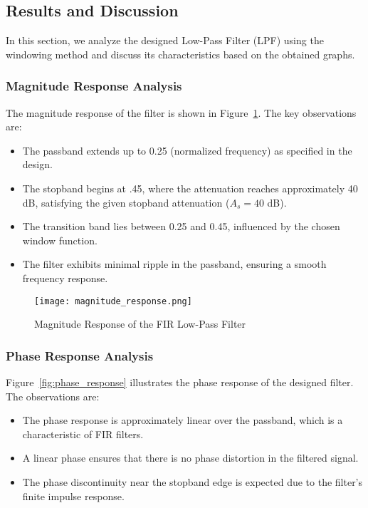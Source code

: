 \documentclass[a4paper,12pt]{article}
\begin{document}
\subsection{Results and Discussion}

In this section, we analyze the designed Low-Pass Filter (LPF) using the windowing method and discuss its characteristics based on the obtained graphs.

\subsubsection{Magnitude Response Analysis}
The magnitude response of the filter is shown in Figure~\ref{fig:mag_response}. The key observations are:
\begin{itemize}
    \item The passband extends up to 0.25 (normalized frequency) as specified in the design.
    \item The stopband begins at .45, where the attenuation reaches approximately 40 dB, satisfying the given stopband attenuation (\( A_s = 40 \) dB).
    \item The transition band lies between 0.25 and 0.45, influenced by the chosen window function.
    \item The filter exhibits minimal ripple in the passband, ensuring a smooth frequency response.
\end{itemize}

\begin{figure}[H]
    \centering
    \texttt{[image: magnitude\_response.png]}
    \caption{Magnitude Response of the FIR Low-Pass Filter}
    \label{fig:mag_response}
\end{figure}

\subsubsection{Phase Response Analysis}
Figure~\ref{fig:phase_response} illustrates the phase response of the designed filter. The observations are:
\begin{itemize}
    \item The phase response is approximately linear over the passband, which is a characteristic of FIR filters.
    \item A linear phase ensures that there is no phase distortion in the filtered signal.
    \item The phase discontinuity near the stopband edge is expected due to the filter’s finite impulse response.
\end{itemize}
\end{document}
